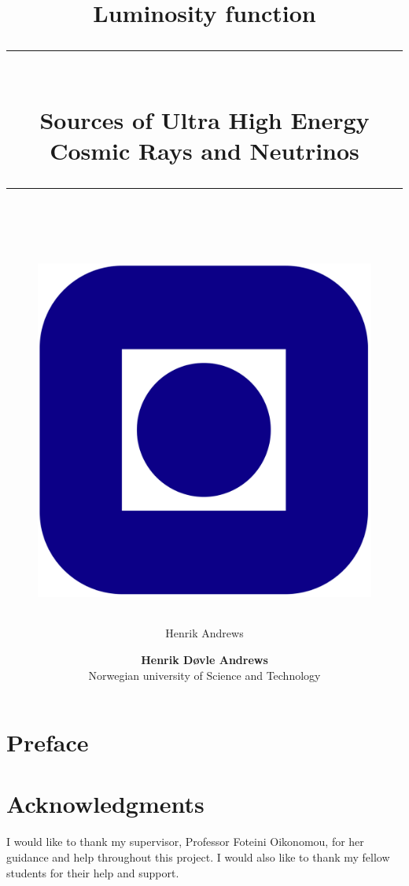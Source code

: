 \documentclass[]{article}
\title{Luminosity function}
\author{Henrik Andrews}
\newcommand{\HRule}[1]{\rule{\linewidth}{#1}}
\begin{document}
\title{ \normalsize
	\HRule{0.5pt} \\
	\LARGE \textbf{{Sources of Ultra High Energy Cosmic Rays and Neutrinos}}	
	\\
	\HRule{2pt} \\ [0.5cm]		
	\vspace{6cm}
	\begin{figure}[htp]
    \centering
    \includegraphics[width=.2\textwidth]{Plots/Logo-Ntnu.svg.png}
    \end{figure}
}

\author{
    \normalsize 
	\textbf{Henrik Døvle Andrews } \\
	Norwegian university of Science and Technology \\ 
}

\maketitle
\setcounter{page}{ 0 }

\newpage

\pagestyle{fancy}
\fancyhf{}
\setlength\headheight{14pt}
\fancyhead[R]{\leftmark}
\setcounter{page}{1}


\maketitle
\section*{Preface}
\lipsum[1]


\begin{abstract}
\lipsum[1]

\end{abstract}

\newpage 
\section*{Acknowledgments}
I would like to thank my supervisor, Professor Foteini Oikonomou, for her guidance and help throughout this project. I would also like to thank my fellow students for their help and support. \cite{Balasubramaniam_2021}
\end{document}

